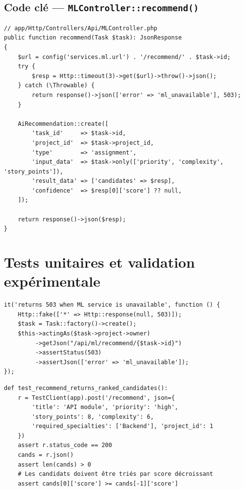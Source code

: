 \subsection{Code clé — \texttt{MLController::recommend()}}

\begin{lstlisting}[style=phpstyle,caption={MLController::recommend() — Proxy Laravel vers FastAPI},label={lst:ml_recommend}]
// app/Http/Controllers/Api/MLController.php
public function recommend(Task $task): JsonResponse
{
    $url = config('services.ml.url') . '/recommend/' . $task->id;
    try {
        $resp = Http::timeout(3)->get($url)->throw()->json();
    } catch (\Throwable) {
        return response()->json(['error' => 'ml_unavailable'], 503);
    }

    AiRecommendation::create([
        'task_id'     => $task->id,
        'project_id'  => $task->project_id,
        'type'        => 'assignment',
        'input_data'  => $task->only(['priority', 'complexity', 'story_points']),
        'result_data' => ['candidates' => $resp],
        'confidence'  => $resp[0]['score'] ?? null,
    ]);

    return response()->json($resp);
}
\end{lstlisting}

\section{Tests unitaires et validation expérimentale}

\begin{lstlisting}[style=phpstyle,caption={Tests unitaires Laravel — MLController},label={lst:tests_s5_php}]
it('returns 503 when ML service is unavailable', function () {
    Http::fake(['*' => Http::response(null, 503)]);
    $task = Task::factory()->create();
    $this->actingAs($task->project->owner)
         ->getJson("/api/ml/recommend/{$task->id}")
         ->assertStatus(503)
         ->assertJson(['error' => 'ml_unavailable']);
});
\end{lstlisting}

\begin{lstlisting}[style=pythonstyle,caption={Tests unitaires Python — FastAPI},label={lst:tests_s5_py}]
def test_recommend_returns_ranked_candidates():
    r = TestClient(app).post('/recommend', json={
        'title': 'API module', 'priority': 'high',
        'story_points': 8, 'complexity': 6,
        'required_specialties': ['Backend'], 'project_id': 1
    })
    assert r.status_code == 200
    cands = r.json()
    assert len(cands) > 0
    # Les candidats doivent être triés par score décroissant
    assert cands[0]['score'] >= cands[-1]['score']
\end{lstlisting}

